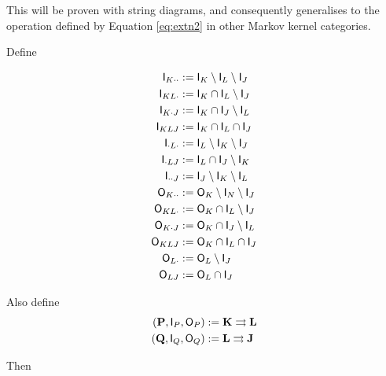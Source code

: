 This will be proven with string diagrams, and consequently generalises to the operation defined by Equation \ref{eq:extn2} in other Markov kernel categories.

Define

\begin{align}
    \mathsf{I}_{K\cdot\cdot}&:=\mathsf{I}_K\setminus\mathsf{I}_L\setminus\mathsf{I}_J\\
    \mathsf{I}_{KL\cdot}&:=\mathsf{I}_K\cap\mathsf{I}_L\setminus\mathsf{I}_J\\
    \mathsf{I}_{K\cdot J}&:=\mathsf{I}_K\cap\mathsf{I}_J\setminus\mathsf{I}_L\\
    \mathsf{I}_{KL J}&:=\mathsf{I}_K\cap \mathsf{I}_L\cap\mathsf{I}_J\\
    \mathsf{I}_{\cdot L \cdot} &:= \mathsf{I}_L\setminus\mathsf{I}_K\setminus \mathsf{I}_J\\
    \mathsf{I}_{\cdot L J} &:= \mathsf{I}_L\cap \mathsf{I}_J\setminus \mathsf{I}_K\\
    \mathsf{I}_{\cdot\cdot J} &:= \mathsf{I}_J\setminus\mathsf{I}_K\setminus\mathsf{I}_L\\
    \mathsf{O}_{K\cdot\cdot} &:= \mathsf{O}_K\setminus\mathsf{I}_N\setminus\mathsf{I}_J\\
    \mathsf{O}_{KL\cdot} &:= \mathsf{O}_K\cap\mathsf{I}_L\setminus\mathsf{I}_J\\
    \mathsf{O}_{K\cdot J} &:= \mathsf{O}_K\cap\mathsf{I}_J\setminus\mathsf{I}_L\\
    \mathsf{O}_{KLJ} &:= \mathsf{O}_K\cap\mathsf{I}_L\cap\mathsf{I}_J\\
    \mathsf{O}_{L\cdot} &:= \mathsf{O}_L\setminus\mathsf{I}_J\\
    \mathsf{O}_{LJ} &:= \mathsf{O}_L\cap\mathsf{I}_J
\end{align}

Also define
\begin{align}
    (\mathbf{P},\mathsf{I}_P,\mathsf{O}_P)&:=\mathbf{K}\rightrightarrows \mathbf{L}\\
    (\mathbf{Q},\mathsf{I}_Q,\mathsf{O}_Q)&:=\mathbf{L}\rightrightarrows \mathbf{J}
\end{align}

Then


